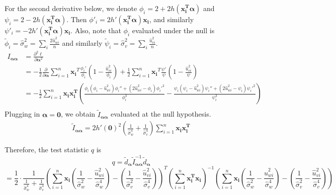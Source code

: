 \documentclass[12pt]{article}
\theoremstyle{theorem}
\begin{document}
\noindent For the second derivative below, we denote $\phi_i = 2+2h(\bm{x_i^T\alpha})$ and $\psi_i = 2-2h(\bm{x_i^T\alpha})$. Then $\phi'_i = 2h'(\bm{x_i^T\alpha})\bm{x_i}$, and similarly $\psi'_i = -2h'(\bm{x_i^T\alpha})\bm{x_i}$. Also, note that $\phi_i$ evaluated under the null is $\tilde{\phi}_i = \hat{\sigma}_w^2 = \sum_i \frac{2\hat{u}_{wi}^2}{n}$ and similarly $\tilde{\psi}_i = \hat{\sigma}_v^2 = \sum_i \frac{\hat{u}_{vi}^2}{n}$.
\begin{align*}
I_{\bm{\alpha\alpha}} &= \frac{\partial^2 \ell}{\partial \bm{\alpha}^2} \\
&= 
-\frac{1}{2} \frac{\partial}{\partial {\bm{\alpha}}} 
\sum_{i=1}^{n} \bm{x_i}^T\frac{\phi_i'}{\phi_i}\left( 1- \frac{\hat{u}_{vi}^2}{\phi_i}\right) + \frac{1}{2} \sum_{i=1}^{n} \bm{x_i}^T \frac{\psi'}{\psi} \left(1 - \frac{\hat{u}_{vi}^2}{\psi} \right)\\
&= -\frac{1}{2} \sum_{i=1}^{n} \bm{x_i x_i^T} \left(\frac{\phi_i (\phi_i-\hat{u}_{wi}^2) \phi_i'' + (2\hat{u}_{wi}^2 - \phi_i)\phi_i'^2}{\phi_i^3} 
- 
\frac{\psi_i (\psi_i-\hat{u}_{wi}^2) \psi_i'' + (2\hat{u}_{wi}^2 - \psi_i)\psi_i'^2}{\psi_i^3}  \right)\\
\end{align*}
Plugging in $\bm{\alpha} = \bm{0}$, we obtain $\tilde{I}_{\bm{\alpha\alpha}}$ evaluated at the null hypothesis.
\begin{align*}
\tilde{I}_{\bm{\alpha\alpha}} = 2h'(\bm{0})^2 \left( \frac{1}{\hat{\sigma}_w^4}  + \frac{1}{\hat{\sigma}_v^4}\right)\sum_{i=1}^{n}  \bm{x_i x_i^T}
\end{align*}

\noindent Therefore, the test statistic $q$ is 
\begin{equation}
q = \tilde{d}_{\bm{\alpha}} \tilde{I}_{\bm{\alpha\alpha}}^{-1} \tilde{d}_{\bm{\alpha}}
\label{original_LM}
\end{equation}
$$ = \frac{1}{2} \cdot \frac{1}{\frac{1}{\hat{\sigma}_w^4} + \frac{1}{\hat{\sigma}_v^4}} \left(
\sum_{i=1}^{n} \bm{x_{i}} 
\left(
\frac{1}{\hat{\sigma}_w^2} - \frac{\hat{u}_{wi}^2}{\hat{\sigma}_w^4}\right)  - \left( \frac{1}{\hat{\sigma}_v^2} - \frac{\hat{u}_{vi}^2}{\hat{\sigma}_v^4}
\right)
\right)^T 
\left( \sum_{i=1}^{n} \bm{x_i^T x_i} \right)^{-1}
\left(
\sum_{i=1}^{n} \bm{x_{i}} 
\left(
\frac{1}{\hat{\sigma}_w^2} - \frac{\hat{u}_{wi}^2}{\hat{\sigma}_w^4}\right)  - \left( \frac{1}{\hat{\sigma}_v^2} - \frac{\hat{u}_{vi}^2}{\hat{\sigma}_v^4}
\right)
\right)
$$
\end{document}
